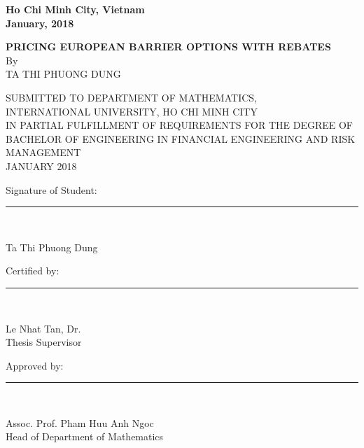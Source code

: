 \documentclass[12pt,a4paper,left=2cm,right=2cm,oneside,titlepage]{report}
\numberwithin{equation}{section}
\begin{document}
\vspace{4.4cm}

\begin{center}
	\fontsize{12pt}{18pt}\selectfont \textbf{Ho Chi Minh City, Vietnam\\
	January, 2018}
\end{center}

\newpage

\begin{center}
	\fontsize{11pt}{18pt}\selectfont \textbf{PRICING EUROPEAN BARRIER OPTIONS WITH REBATES}\\
	\fontsize{11pt}{18pt}\selectfont By\\
	TA THI PHUONG DUNG\\ \vspace{18pt}

	SUBMITTED TO DEPARTMENT OF MATHEMATICS,\\
	INTERNATIONAL UNIVERSITY, HO CHI MINH CITY\\
	IN PARTIAL FULFILLMENT OF REQUIREMENTS FOR THE DEGREE OF\\ BACHELOR OF ENGINEERING IN FINANCIAL ENGINEERING AND RISK MANAGEMENT\\
	JANUARY 2018 	
\end{center}

	\vspace{54pt}	
\fontsize{12pt}{0pt}\selectfont Signature of Student: \hspace{50pt}\rule[0.02cm]{8cm}{0.0006cm} \\
\begin{flushright}
	Ta Thi Phuong Dung
\end{flushright} \vspace{18pt}
\hspace{14pt} \fontsize{12pt}{0pt}\selectfont Certified by: \hspace{94pt}\rule[0.02cm]{8cm}{0.0006cm} \\
\begin{flushright}
	Le Nhat Tan, Dr.\\ \vspace{10pt}
	Thesis Supervisor
\end{flushright}  \vspace{18pt}
\hspace{14pt} \fontsize{12pt}{0pt}\selectfont Approved by: \hspace{90pt}\rule[0.02cm]{8cm}{0.0006cm} \\
\begin{flushright}
	Assoc. Prof. Pham Huu Anh Ngoc\\ \vspace{10pt}
	Head of Department of Mathematics
\end{flushright}
\end{document}
